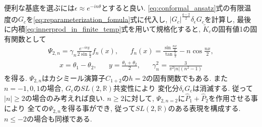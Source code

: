 便利な基底を選ぶには$\epsilon \approx e^{-in\theta}$とすると良い. 
\eqref{eq:conformal_ansatz}式の有限温度の$G_c$を\eqref{eq:reparameterization_fomula}式に代入し, 
$|G_c|^{\frac{q-2}{2}}\delta_{\epsilon}G_c$を計算し, 
最後に内積\eqref{eq:innerprod_in_finite_temp}式を用いて規格化すると, 
$\tilde{K}_c$の固有値1の固有関数として
\begin{align}
	\Psi_{2,n} = \gamma_n\frac{e^{-iny}}{2\sin\frac{x}{2}}f_n(x),\hspace{20pt}
	f_n(x) = \frac{\sin\frac{nx}{2}}{\tan\frac{x}{2}} - n\cos\frac{nx}{2},
	\label{eq:eigenfunc_with_eigenvalue_1}
\end{align}
\begin{align}
	x = \theta_1 - \theta_2,\hspace{20pt}
	y = \frac{\theta_1 + \theta_2}{2},\hspace{20pt}
	\gamma_n^2 = \frac{3}{\pi^2|n|(n^2 - 1)}
	\label{eq:x_y_squaregamma}
\end{align}
を得る. 
$\Psi_{2,n}$はカシミール演算子$C_{1+2}$の$h=2$の固有関数でもある. 
また$n=-1,0,1$の場合, $G_c$の$SL(2,\mathbb{R})$共変性により
変化分$\delta_{\epsilon}G_c$は消滅する. 
従って$|n| \geq 2$の場合のみ考えれば良い. 
$n \geq 2$に対して, $\Psi_{2,n=2}$に$\hat{P}_1 + \hat{P}_2$を作用させる事により
全ての$\Psi_{2,n}$を得る事ができ, 従って$SL(2,\mathbb{R})$のある表現を構成する. 
$n \leq -2$の場合も同様である. 

